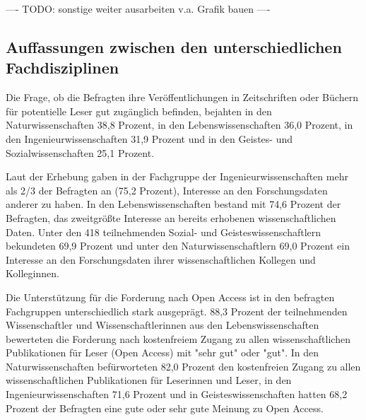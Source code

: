 ---- TODO: sonstige weiter ausarbeiten v.a. Grafik bauen ----

\subsection{Auffassungen zwischen den unterschiedlichen Fachdisziplinen}

Die Frage, ob die Befragten ihre Veröffentlichungen in Zeitschriften oder Büchern für potentielle Leser gut zugänglich befinden, bejahten in den Naturwissenschaften 38,8 Prozent, in den Lebenswissenschaften 36,0 Prozent, in den Ingenieurwissenschaften 31,9 Prozent und in den Geistes- und Sozialwissenschaften 25,1 Prozent.

Laut der Erhebung gaben in der Fachgruppe der Ingenieurwissenschaften mehr als 2/3 der Befragten an (75,2 Prozent), Interesse an den Forschungsdaten anderer  zu haben. In den Lebenswissenschaften bestand mit 74,6 Prozent der Befragten, das zweitgrößte Interesse an bereits erhobenen wissenschaftlichen Daten. Unter den 418 teilnehmenden Sozial- und Geisteswissenschaftlern bekundeten 69,9 Prozent und unter den Naturwissenschaftlern 69,0 Prozent ein Interesse an den Forschungsdaten ihrer wissenschaftlichen Kollegen und Kolleginnen.

Die Unterstützung für die Forderung nach Open Access ist in den befragten Fachgruppen unterschiedlich stark ausgeprägt. 88,3 Prozent der teilnehmenden Wissenschaftler und Wissenschaftlerinnen aus den Lebenswissenschaften bewerteten die Forderung nach kostenfreiem Zugang zu allen wissenschaftlichen Publikationen für Leser (Open Access) mit "sehr gut" oder "gut". In den Naturwissenschaften befürworteten 82,0 Prozent den kostenfreien Zugang zu allen wissenschaftlichen Publikationen für Leserinnen und Leser, in den Ingenieurwissenschaften 71,6 Prozent und in Geisteswissenschaften hatten 68,2 Prozent der Befragten eine gute oder sehr gute Meinung zu Open Access.

